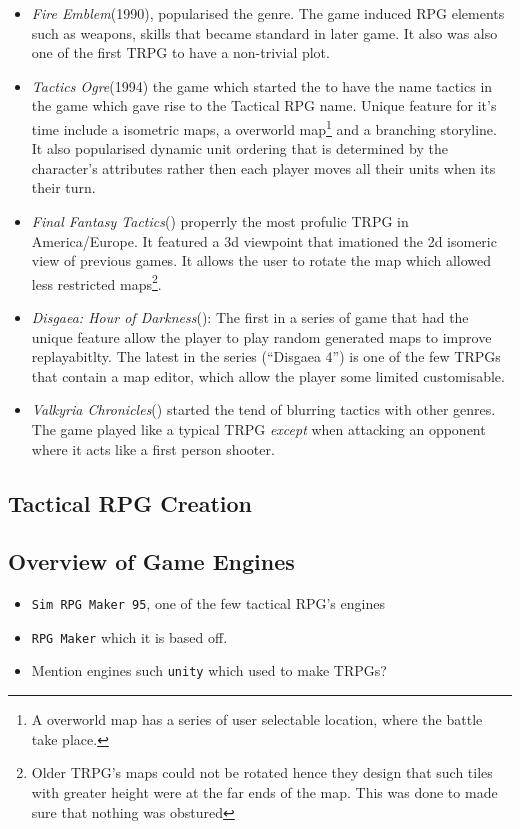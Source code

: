 \begin{itemize}
	
	\item \emph{Fire Emblem}(1990), popularised the genre. The game induced RPG elements such as weapons, skills that became standard in later game. It also was also one of the first TRPG to have a non-trivial plot. 

	\item \emph{Tactics Ogre}(1994) the game which started the to have the name tactics in the game  which gave rise to the Tactical RPG name\footnotemark[\value{footnote}]\cite{tactics}. Unique feature for it's time include a isometric maps, a overworld map\footnote{A overworld map has a series of user selectable location, where the battle take place.} and  a branching storyline. It also popularised dynamic unit ordering that is determined by the character's attributes rather then each player moves all their units when its their turn.

	\item \emph{Final Fantasy Tactics}() properrly the most profulic TRPG in America/Europe. It featured a 3d viewpoint that imationed  the 2d isomeric view of previous games.  It allows the user to rotate the map which allowed less restricted maps\footnote{Older TRPG's maps could not be rotated hence they design that such tiles with greater height were at the far ends of the map. This was done to made sure that nothing was obstured}.
	
	\item  \emph{Disgaea: Hour of Darkness}(): The first in a series of game that had the unique feature allow the player to play random generated maps to improve replayabitlty. The latest in the series (``Disgaea 4'') is one of the few TRPGs that contain a map editor, which allow the player some limited customisable. 


	\item  \emph{Valkyria Chronicles}() started the tend of blurring tactics with other genres. The game played like a typical TRPG \emph{except} when attacking an opponent where it acts like a first person shooter.

\end{itemize}

\subsection{Tactical RPG Creation}

\subsection{Overview of Game Engines}
\label{sub:overview_of_game_engines}

\begin{itemize}
	\item \texttt{Sim RPG Maker 95}, one of the few tactical RPG's engines
	\item \texttt{RPG Maker} which it is based off. 
	\item Mention  engines such \texttt{unity} which used to make TRPGs?  
\end{itemize}

